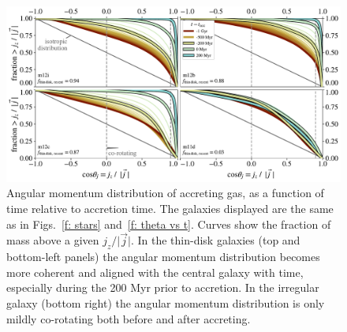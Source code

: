 \documentclass[fleqn,usenatbib]{mnras}
\begin{document}
\begin{figure}
    \centering
    \includegraphics[width=\textwidth]{figures/variations/relative_to_accretion/jzjmag_vs_t.pdf}
    \caption{
    Angular momentum distribution of accreting gas, as a function of time relative to accretion time.
    The galaxies displayed are the same as in Figs.~\ref{f: stars} and~\ref{f: theta vs t}.
    Curves show the fraction of mass above a given $j_z / \vert \vec j \vert$. 
    In the thin-disk galaxies (top and bottom-left panels) the angular momentum distribution becomes more coherent and aligned with the central galaxy with time, especially during the 200 Myr prior to accretion.
    In the irregular galaxy (bottom right) the angular momentum distribution is only mildly co-rotating  both before and after accreting. 
    }
    \label{f: coherence}
\end{figure}
\end{document}
